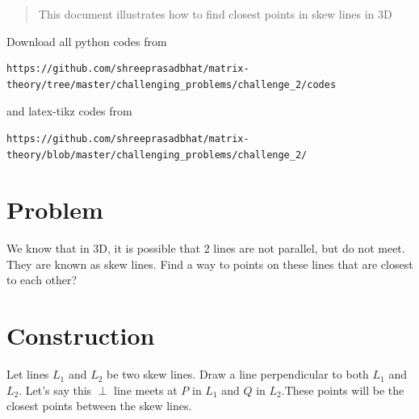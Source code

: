 \documentclass[journal,12pt,twocolumn]{IEEEtran}
\begin{document}
%
\begin{abstract}
This  document  illustrates  how to find closest points in skew lines in 3D
\end{abstract}
Download all python codes from 
%
\begin{lstlisting}
https://github.com/shreeprasadbhat/matrix-theory/tree/master/challenging_problems/challenge_2/codes
\end{lstlisting}
%
and latex-tikz codes from 
%
\begin{lstlisting}
https://github.com/shreeprasadbhat/matrix-theory/blob/master/challenging_problems/challenge_2/
\end{lstlisting}
%
\section{Problem}

We know that in 3D, it is possible that 2 lines are not parallel, but do not meet.  They are known as skew lines. Find a way to points on these lines that are closest to each other?

\section{Construction}

Let lines $L_1$ and $L_2$ be two skew lines. Draw a line perpendicular to both $L_1$ and $L_2$. Let's say this $\perp$ line meets at $P$ in $L_1$ and $Q$ in $L_2$.These points will be the closest points between the skew lines.
\end{document}
